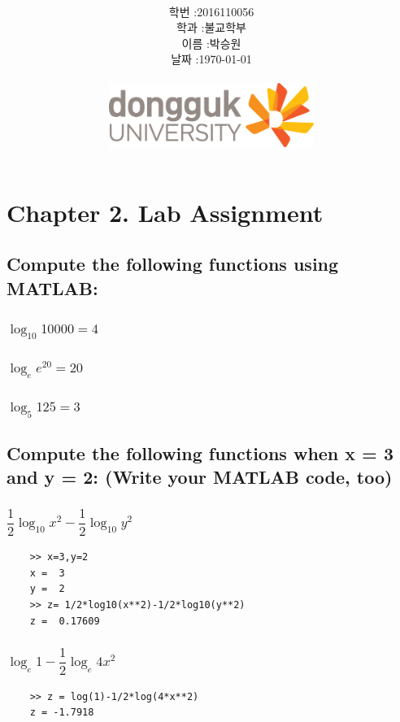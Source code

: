 \documentclass[12pt,a4paper]{article}
\title{
	\centering
	\pgfornament[width=12cm,color=teal]{84}\\
	\vspace{1cm}
	\fontsize{50}{50} \selectfont {정보통신 수학 및 실습\\3월 4주차 Lab assignment}\\
		\pgfornament[width=12cm,color=teal]{88}\\
	\vfill}
\author{
	\LARGE
	\begin{tabular}{rl}
		\hline
		학번 : & 2016110056\\ 
		학과 : & 불교학부 \\
		이름 : & 박승원\\
		날짜 : & \today\\
		\hline
	\end{tabular}\vspace{1cm}
	\\
\includegraphics[width=0.5\textwidth]{logo.jpg}
	}
\date{}
\begin{document}
\maketitle
{}
\noindent
\lstset{language=matlab, columns=flexible, tabsize=4, frame=shadowbox, showstringspaces=false, breaklines=true, upquote=true, basicstyle=\normalsize}

\renewcommand{\thesubsubsection}{\alph{subsubsection})}
\renewcommand{\thesubsection}{\arabic{subsection}.}
\newpage
\section*{Chapter 2. Lab Assignment}
\subsection{Compute the following functions using MATLAB:} 

\subsubsection{$\log_{10}{10000}=4$}

\subsubsection{$\log_e{e^{20}}=20$}
\subsubsection{$\log_{5}{125}=3$}

\subsection{Compute the following functions when x = 3 and y = 2: (Write your MATLAB code, too)} 

\subsubsection{$\dfrac{1}{2}\log_{10}x^2-\dfrac{1}{2}\log_{10}y^2$}
\begin{lstlisting}
	>> x=3,y=2
	x =  3
	y =  2
	>> z= 1/2*log10(x**2)-1/2*log10(y**2)
	z =  0.17609
\end{lstlisting}
\subsubsection{$\log_e1-\dfrac{1}{2}\log_e4x^2$}
\begin{lstlisting}
	>> z = log(1)-1/2*log(4*x**2)
	z = -1.7918
\end{lstlisting}
\end{document}
